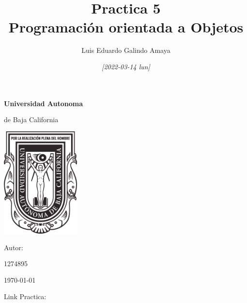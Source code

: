 \documentclass[11pt]{article}
\author{Luis Eduardo Galindo Amaya}
\date{\textit{[2022-03-14 lun]}}
\title{Practica 5\\\medskip
\large Programación orientada a Objetos}
\begin{document}
\pagestyle{fancy}
\fancyhf{}
\cfoot{\thepage}


\begin{titlepage}
\centering
{\bfseries\LARGE Universidad Autonoma \par de Baja California \par}
\vfill
{\scshape\Huge \@title \par}
\vfill
\begin{center}
\includegraphics[width=4cm]{../0imports/img/logo}
\end{center}
\vfill
{\Large Autor: \par}
{\Large \@author \par}
1274895
\vfill
{\Large \today \par}
\end{titlepage}

\setcounter{tocdepth}{2}
\tableofcontents

\begin{center}
\vfill
Link Practica: 
\pagebreak
\end{center}
\end{document}
